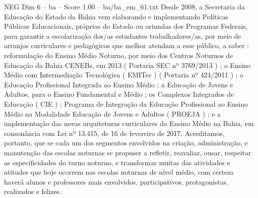 \begin{textsample}{NEG Dim 6 – ba – Score 1.00 – ba/ba\_em\_61.txt}
Desde 2008, a Secretaria da Educação do Estado da Bahia vem elaborando e implementando Políticas Públicas Educacionais, próprias do Estado ou oriundas dos Programas Federais, para garantir a escolarização dos/as estudantes trabalhadores/as, por meio de arranjos curriculares e pedagógicos que melhor atendam a esse público, a saber : reformulação do Ensino Médio Noturno, por meio dos Centros Noturnos de Educação da Bahia CENEBs, em 2013 ( Portaria SEC nº 3769/2013 ) ; o Ensino Médio com Intermediação Tecnológica ( EMITec ) ( Portaria nº 424/2011 ) ; a Educação Profissional Integrada ao Ensino Médio ; a Educação de Jovens e Adultos, para o Ensino Fundamental e Médio ; os Complexos Integrados de Educação ( CIE ) ; Programa de Integração da Educação Profissional ao Ensino Médio na Modalidade Educação de Jovens e Adultos ( PROEJA ) ; e a implementação das novas arquiteturas curriculares do Ensino Médio na Bahia, em consonância com Lei nº 13.415, de 16 de fevereiro de 2017.
Acreditamos, portanto, que se cada um dos segmentos envolvidos na criação, administração, e manutenção das escolas noturnas se propuser a refletir, reavaliar, ousar, respeitar as especificidades do turno noturno, e transformar muitas das atividades e atitudes que hoje ocorrem nas escolas noturnas de nível médio, com certeza haverá alunos e professores mais envolvidos, participativos, protagonistas, realizados e felizes.

\end{textsample}
